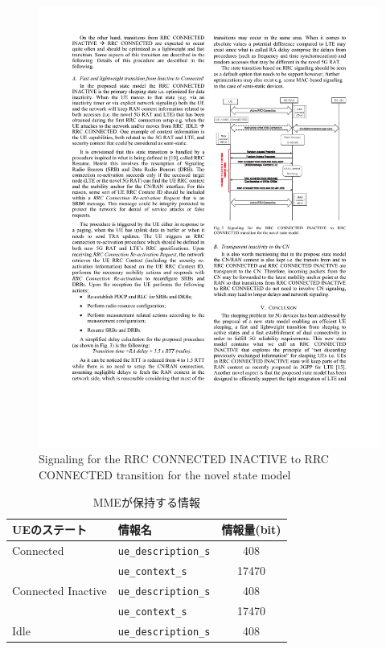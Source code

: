 \documentclass[a4j]{ujarticle}
\begin{document}
\begin{figure}[htbp]
  \centering
  \includegraphics[width=0.9\hsize]{Signaling_for_the_RRC_CONNECTED_INACTIVE_to_RRC_CONNECTED_transition_for_the_novel_state_model.pdf}
  \caption{Signaling for the RRC CONNECTED INACTIVE to RRC CONNECTED transition for the novel state model}
  \label{Signaling_for_the_RRC_CONNECTED_INACTIVE_to_RRC_CONNECTED_transition_for_the_novel_state_model}
\end{figure}

\begin{table}[htbp]
  \centering
  \caption{MMEが保持する情報}
  \label{table:OAI_mme_memory}
  \begin{tabular}{l|l|c}
    \hline
    UEのステート  & 情報名 & 情報量(bit)  \\ \hline \hline
    Connected & \verb|ue_description_s| & 408 \\
    & \verb|ue_context_s| & 17470\\\hline
    Connected Inactive & \verb|ue_description_s| & 408 \\
    & \verb|ue_context_s| & 17470\\\hline
    Idle & \verb|ue_description_s| & 408 \\
  \end{tabular}
\end{table}
\clearpage
\end{document}
